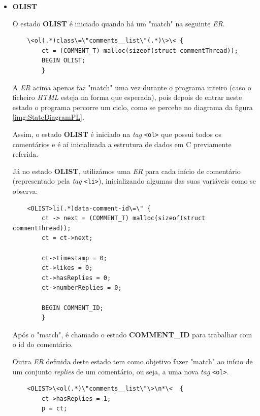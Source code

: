 \documentclass[a4paper,12pt]{report}
\newcommand*{\xml}[1]{\texttt{<#1>}}
\begin{document}
\begin{itemize}
    \item 
    \textbf{OLIST}
    \par O estado \textbf{OLIST} é iniciado quando há um "match" na seguinte \textit{ER}.


\begin{verbatim}
    \<ol(.*)class\=\"comments__list\"(.*)\>\< { 
        ct = (COMMENT_T) malloc(sizeof(struct commentThread));
        BEGIN OLIST; 
        }
\end{verbatim}

\par A \textit{ER} acima apenas faz "match" \hspace{0.001cm} uma vez durante o programa inteiro (caso o ficheiro \textit{HTML} esteja na forma que esperada), pois depois de entrar neste estado o programa percorre um ciclo, como se percebe no diagrama da figura \ref{img:StateDiagramPL}. 
\par Assim, o estado \textbf{OLIST} é iniciado na \textit{tag} \xml{ol} que possui todos os comentários e é aí inicializada a estrutura de dados em C previamente referida.

\vspace{0.5cm}
\par Já no estado \textbf{OLIST}, utilizámos uma \textit{ER} para cada início de comentário (representado pela \textit{tag} \xml{li}), inicializando algumas das suas variáveis como se observa:

\begin{verbatim}
    <OLIST>li(.*)data-comment-id\=\" {  
        ct -> next = (COMMENT_T) malloc(sizeof(struct commentThread));
        ct = ct->next;

        ct->timestamp = 0;
        ct->likes = 0;
        ct->hasReplies = 0;
        ct->numberReplies = 0;

        BEGIN COMMENT_ID;
        }
\end{verbatim}

\par Após o "match", é chamado o estado \textbf{COMMENT\_ID} para trabalhar com o id do comentário.

\vspace{10cm}

\par Outra \textit{ER} definida deste estado tem como objetivo fazer "match" ao início de um conjunto \textit{replies} de um comentário, ou seja, a uma nova \textit{tag} \xml{ol}.

\begin{verbatim}
    <OLIST>\<ol(.*)\"comments__list\"\>\n*\<  {  
        ct->hasReplies = 1;
        p = ct;


\end{verbatim}
\end{itemize}
\end{document}
